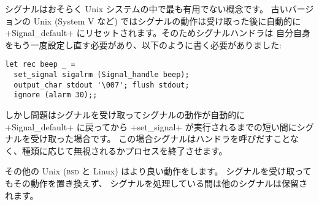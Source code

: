 シグナルはおそらく Unix システムの中で最も有用でない概念です。
古いバージョンの Unix (System V など) ではシグナルの動作は受け取った後に自動的に
\ml+Signal_default+ にリセットされます。そのためシグナルハンドラは
自分自身をもう一度設定し直す必要があり、以下のように書く必要がありました:
%
\begin{lstlisting}
let rec beep _ =
  set_signal sigalrm (Signal_handle beep);
  output_char stdout '\007'; flush stdout;
  ignore (alarm 30);;
\end{lstlisting}
%
しかし問題はシグナルを受け取ってシグナルの動作が自動的に \ml+Signal_default+ に戻ってから
\ml+set_signal+ が実行されるまでの短い間にシグナルを受け取った場合です。
この場合シグナルはハンドラを呼びだすことなく、種類に応じて無視されるかプロセスを終了させます。

その他の Unix (\textsc{bsd} と Linux) はより良い動作をします。
シグナルを受け取ってもその動作を置き換えず、
シグナルを処理している間は他のシグナルは保留されます。
